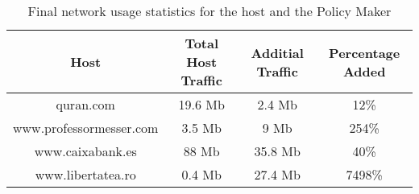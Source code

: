 \begin{table}
\begin{center}
\begin{tabular}{| c c c c |}
	\hline
	Host & Total Host Traffic & Additial Traffic & Percentage Added \\ \hline
	quran.com               & 19.6 Mb &  2.4 Mb &    12\% \\ \hline 
	www.professormesser.com & 3.5 Mb  &    9 Mb &   254\% \\ \hline 
	www.caixabank.es        & 88 Mb   & 35.8 Mb &    40\% \\ \hline 
	www.libertatea.ro       & 0.4 Mb  & 27.4 Mb &  7498\% \\ \hline 
\end{tabular}
\end{center}
\label{tab:percentage}
	\caption{Final network usage statistics for the host and the Policy Maker}
\end{table}
%
%												
%
%
%
%
% 
% 
